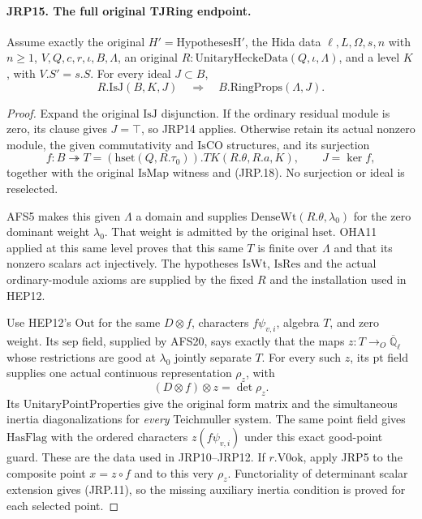 \paragraph{JRP15. The full original TJRing endpoint.}
\label{claim:JRP15}
\leavevmode\par
Assume exactly the original \(H'=\mathrm{HypothesesH'}\),
the Hida data \(\ell,L,\Omega,s,n\) with \(n\ge1\),
\(V,Q,c,r,\iota,B,\Lambda\), an original
\(R:\mathrm{UnitaryHeckeData}(Q,\iota,\Lambda)\), and a
level \(K\), with \(V.S'=s.S\).  For every ideal
\(J\subset B\),
\[
             R.\mathrm{IsJ}(B,K,J)
                    \quad\Longrightarrow\quad
             B.\mathrm{RingProps}(\Lambda,J).
 \tag{JRP.19}
\]
\begin{proof}
Expand the original \(\mathrm{IsJ}\) disjunction.  If the
ordinary residual module is zero, its clause gives \(J=\top\),
so JRP14 applies.  Otherwise retain its actual nonzero module,
the given commutativity and \(\mathrm{IsCO}\) structures, and
its surjection
\[
 f:B\twoheadrightarrow
 T=(\mathrm{hset}(Q,R.\tau_0)).TK(R.\theta,R.a,K),
 \qquad J=\ker f,
 \tag{JRP.20}
\]
together with the original \(\mathrm{IsMap}\) witness and
(JRP.18).  No surjection or ideal is reselected.

AFS5 makes this given \(\Lambda\) a domain and supplies
\(\mathrm{DenseWt}(R.\theta,\lambda_0)\) for the zero
dominant weight \(\lambda_0\).  That weight is admitted by
the original \(\mathrm{hset}\).  OHA11 applied at this same
level proves that this same \(T\) is finite over \(\Lambda\)
and that its nonzero scalars act injectively.  The hypotheses
\(\mathrm{IsWt}\), \(\mathrm{IsRes}\) and the actual
ordinary-module axioms are supplied by the fixed \(R\) and
the installation used in HEP12.

Use HEP12's \(\mathrm{Out}\) for the same \(D\otimes f\),
characters \(f\psi_{v,i}\), algebra \(T\), and zero weight.
Its \(\mathrm{sep}\) field, supplied by AFS20, says exactly
that the maps \(z:T\to_O\overline{\mathbb Q}_\ell\) whose
restrictions are good at \(\lambda_0\) jointly separate \(T\).
For every such \(z\), its \(\mathrm{pt}\) field supplies
one actual continuous representation \(\rho_z\), with
\[
 (D\otimes f)\otimes z=\det\rho_z.
\]
Its \(\mathrm{UnitaryPointProperties}\) give the original
form matrix and the simultaneous inertia diagonalizations for
\emph{every} Teichmuller system.  The same point field gives
\(\mathrm{HasFlag}\) with the ordered characters
\(z(f\psi_{v,i})\) under this exact good-point guard.
These are the data used in JRP10--JRP12.  If
\(r.\mathrm{V0ok}\), apply JRP5 to the composite point
\(x=z\circ f\) and to this very \(\rho_z\).  Functoriality
of determinant scalar extension gives (JRP.11), so the missing
auxiliary inertia condition is proved for each selected point.


\end{proof}

